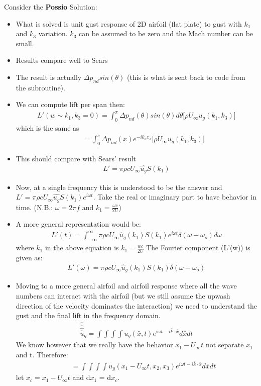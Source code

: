 \documentclass{article}
\begin{document}
\noindent Consider the \textbf{Possio} Solution: \\
\begin{itemize}
\item What is solved is unit gust response of 2D airfoil (flat plate) to gust with $k_1$ and $k_3$ variation. $k_3$ can be assumed to be zero and the Mach number can be small.
\item Results compare well to Sears
\item The result is actually $\Delta p_{nd} sin(\theta)$ (this is what is sent back to code from the subroutine).
\item We can compute lift per span then: \\
\begin{align*}
L'(w \sim k_1,k_3 = 0) = \int_0^\pi \Delta p_{nd} (\theta) sin(\theta) d\theta \Big[ \rho U_{\infty} u_g(k_1,k_3)\Big]
\end{align*}
which is the same as
\begin{align*}
\qquad = \int_0^c \Delta p_{nd}(x) e^{-ik_3x_3} \Big[ \rho U_\infty u_g(k_1,k_3)\Big]
\end{align*}
\item This should compare with Sears' result
\begin{align*}
L' = \pi \rho c U_\infty \hat{u_g} S(k_1)
\end{align*}
\item Now, at a single frequency this is understood to be the answer and $L' = \pi\rho cU_\infty \hat{u_g} S(k_1) e^{i\omega t}$. Take the real or imaginary part to have behavior in time. (N.B.:  $\omega = 2\pi f$ and $k_1 = \frac{\omega c}{2 U}$)
\item A more general representation would be:
\begin{align*}
L'(t) = \int_{-\infty}^\infty \pi \rho c U_\infty \hat u_g(k_1)S(k_1) e^{i\omega t} \delta(\omega - \omega_o) d\omega
\end{align*}
where $k_1$ in the above equation is $k_1 = \frac{wc}{2U}$
The Fourier component (L'(w)) is given as: 
\begin{align*}
L'(\omega) = \pi \rho c U_\infty \hat u_g(k_1)S(k_1)\delta(\omega - \omega_o)
\end{align*}
\item Moving to a more general airfoil and airfoil response where all the wave numbers can interact with the airfoil (but we still assume the upwash direction of the velocity dominates the interaction) we need to understand the gust and the final lift in the frequency domain.
\begin{align*}
\hat{\hat{\hat{\hat {u}}}}_g = \int \int \int \int u_g (\bar x, t)e^{i\omega t - i \bar k \cdot \bar x} d\bar x dt
\end{align*}
We know however that we really have the behavior $x_1 - U_\infty t$ not separate $x_1$ and t. Therefore: 
\begin{align*}
 \qquad =\int \int \int \int u_g(x_1 - U_\infty t, x_2, x_3) e^{i\omega t - i\bar{k}\cdot \bar{x}} d\bar{x}dt
\end{align*}
let $x_c = x_1 - U_\infty t$ and d$x_1$ = d$x_c$.


\end{itemize}
\end{document}

